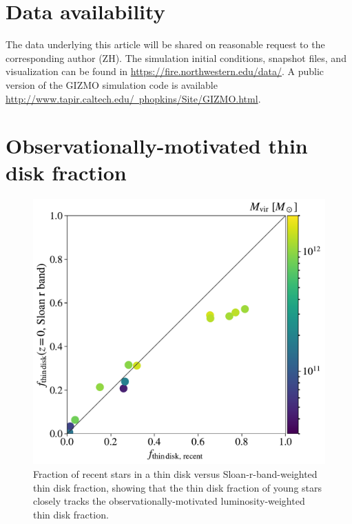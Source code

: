 \documentclass[fleqn,usenatbib]{mnras}
\begin{document}
\section*{Data availability}
The data underlying this article will be shared on reasonable request to the corresponding author (ZH). The simulation initial conditions, snapshot files, and visualization can be found in \href{https://fire.northwestern.edu/data/}{https://fire.northwestern.edu/data/}.
A public version of the GIZMO simulation code is available \href{http://www.tapir.caltech.edu/~phopkins/Site/GIZMO.html}{http://www.tapir.caltech.edu/~phopkins/Site/GIZMO.html}.








\appendix

\section{Observationally-motivated thin disk fraction}
\label{s: appendix-sloan thin disk fraction}

\begin{figure}
    \centering
    \includegraphics[width=\columnwidth]{figures/prevalence/superthin_disk_frac_sloanr_v_superthin_disk_frac_recent.pdf}
    \caption{
    Fraction of recent stars in a thin disk versus Sloan-r-band-weighted thin disk fraction, showing that the thin disk fraction of young stars closely tracks the observationally-motivated luminosity-weighted thin disk fraction.
    }
    \label{f: thin disk v thin disk}
\end{figure}
\end{document}
